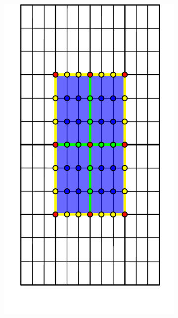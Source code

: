 \begin{figure} [htbp]
\begin{subfigure}[t]{0.22\textwidth}
  \centerline{\includegraphics[width=\linewidth]{figs/MsRSB/FE_12x12_b}}
  \caption{\label{fig:fem_demo_support}}
\end{subfigure}
\hfill
\begin{subfigure}[t]{0.22\textwidth}

\end{subfigure}
\end{figure}
